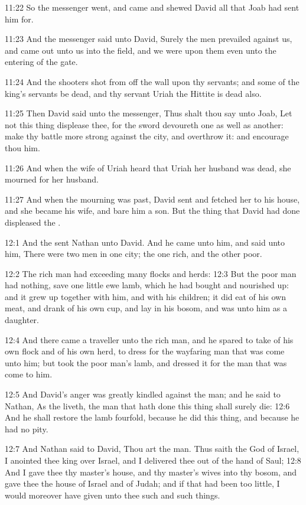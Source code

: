 11:22 So the messenger went, and came and shewed David all that Joab
had sent him for.

11:23 And the messenger said unto David, Surely the men prevailed
against us, and came out unto us into the field, and we were upon them
even unto the entering of the gate.

11:24 And the shooters shot from off the wall upon thy servants; and
some of the king's servants be dead, and thy servant Uriah the Hittite
is dead also.

11:25 Then David said unto the messenger, Thus shalt thou say unto
Joab, Let not this thing displease thee, for the sword devoureth one
as well as another: make thy battle more strong against the city, and
overthrow it: and encourage thou him.

11:26 And when the wife of Uriah heard that Uriah her husband was
dead, she mourned for her husband.

11:27 And when the mourning was past, David sent and fetched her to
his house, and she became his wife, and bare him a son. But the thing
that David had done displeased the \LORD.

12:1 And the \LORD sent Nathan unto David. And he came unto him, and
said unto him, There were two men in one city; the one rich, and the
other poor.

12:2 The rich man had exceeding many flocks and herds: 12:3 But the
poor man had nothing, save one little ewe lamb, which he had bought
and nourished up: and it grew up together with him, and with his
children; it did eat of his own meat, and drank of his own cup, and
lay in his bosom, and was unto him as a daughter.

12:4 And there came a traveller unto the rich man, and he spared to
take of his own flock and of his own herd, to dress for the wayfaring
man that was come unto him; but took the poor man's lamb, and dressed
it for the man that was come to him.

12:5 And David's anger was greatly kindled against the man; and he
said to Nathan, As the \LORD liveth, the man that hath done this thing
shall surely die: 12:6 And he shall restore the lamb fourfold, because
he did this thing, and because he had no pity.

12:7 And Nathan said to David, Thou art the man. Thus saith the \LORD
God of Israel, I anointed thee king over Israel, and I delivered thee
out of the hand of Saul; 12:8 And I gave thee thy master's house, and
thy master's wives into thy bosom, and gave thee the house of Israel
and of Judah; and if that had been too little, I would moreover have
given unto thee such and such things.

